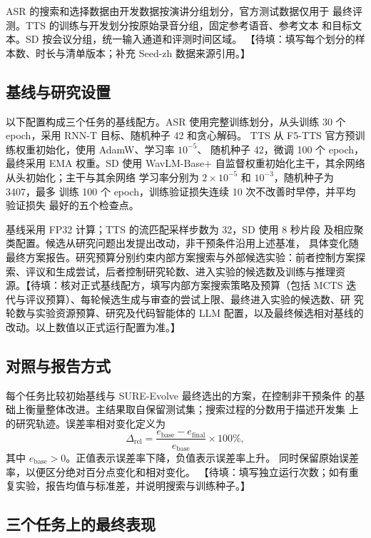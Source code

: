 \documentclass{article}
\newcommand{\pending}[1]{\textcolor{blue!65!black}{【待填：#1】}}
\begin{document}
ASR 的搜索和选择数据由开发数据按演讲分组划分，官方测试数据仅用于
最终评测。TTS 的训练与开发划分按原始录音分组，固定参考语音、参考文本
和目标文本。SD 按会议分组，统一输入通道和评测时间区域。
\pending{填写每个划分的样本数、时长与清单版本；补充 Seed-zh 数据来源引用。}

\subsection{基线与研究设置}

以下配置构成三个任务的基线配方。ASR 使用完整训练划分，从头训练
30 个 epoch，采用 RNN-T 目标、随机种子 42 和贪心解码。
TTS 从 F5-TTS 官方预训练权重初始化，使用 AdamW、学习率 $10^{-5}$、
随机种子 42，微调 100 个 epoch，最终采用 EMA 权重。SD 使用
WavLM-Base+ 自监督权重初始化主干，其余网络从头初始化；主干与其余网络
学习率分别为 $2\times10^{-5}$ 和 $10^{-3}$，随机种子为 3407，最多
训练 100 个 epoch，训练验证损失连续 10 次不改善时早停，并平均验证损失
最好的五个检查点。

基线采用 FP32 计算；TTS 的流匹配采样步数为 32，SD 使用 8 秒片段
及相应聚类配置。候选从研究问题出发提出改动，非干预条件沿用上述基准，
具体变化随最终方案报告。研究预算分别约束内部方案搜索与外部候选实验：前者控制方案探索、评议和生成尝试，后者控制研究轮数、进入实验的候选数及训练与推理资
源。\pending{核对正式基线配方，填写内部方案搜索策略及预算（包括 MCTS 迭代与评议预算）、每轮候选生成与审查的尝试上限、最终进入实验的候选数、研
究轮数与实验资源预算、研究及代码智能体的 LLM 配置，以及最终候选相对基线的改动。以上数值以正式运行配置为准。}

\subsection{对照与报告方式}

每个任务比较初始基线与 SURE-Evolve 最终选出的方案，在控制非干预条件
的基础上衡量整体改进。主结果取自保留测试集；搜索过程的分数用于描述开发集
上的研究轨迹。误差率相对变化定义为
\begin{equation}
\Delta_{\mathrm{rel}}=
\frac{e_{\mathrm{base}}-e_{\mathrm{final}}}{e_{\mathrm{base}}}\times100\%,
\end{equation}
其中 $e_{\mathrm{base}}>0$。正值表示误差率下降，负值表示误差率上升。
同时保留原始误差率，以便区分绝对百分点变化和相对变化。
\pending{填写独立运行次数；如有重复实验，报告均值与标准差，并说明搜索与训练种子。}

\subsection{三个任务上的最终表现}
\label{sec:results}
\end{document}
